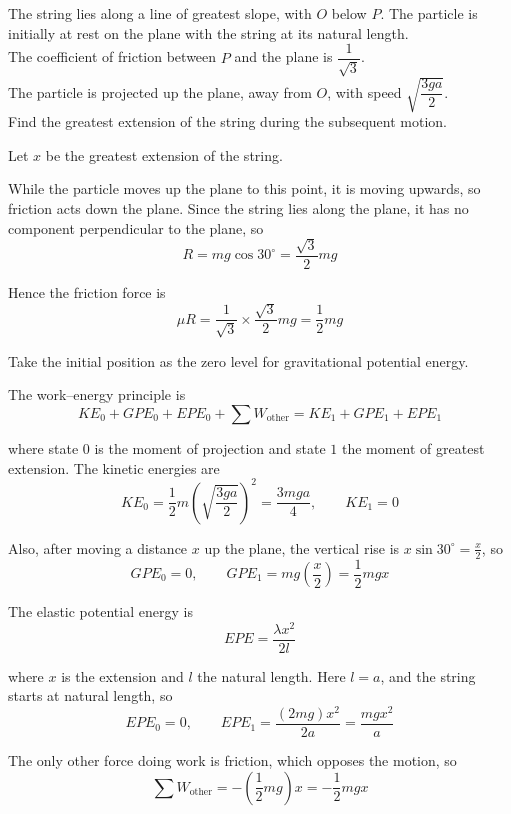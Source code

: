 \documentclass[leqno]{article}
\begin{document}
\begin{enumerate}[
  label=\textbf{\arabic*.},
  leftmargin=*,
  topsep=0pt,
  partopsep=0pt,
  parsep=0pt
]
The string lies along a line of greatest slope, with $O$ below $P$. The particle is initially at rest on the plane with the string at its natural length. \\

The coefficient of friction between $P$ and the plane is $\dfrac{1}{\sqrt{3}}$. \\

The particle is projected up the plane, away from $O$, with speed $\sqrt{\dfrac{3ga}{2}}$. \\

Find the greatest extension of the string during the subsequent motion.  \\

\vspace*{10pt}

\begin{djsSolution}
Let \(x\) be the greatest extension of the string.

While the particle moves up the plane to this point, it is moving upwards, so friction acts down the plane. Since the string lies along the plane, it has no component perpendicular to the plane, so
\[
R=mg\cos 30^\circ=\frac{\sqrt{3}}{2}mg
\]

Hence the friction force is
\[
\mu R=\frac{1}{\sqrt{3}}\times \frac{\sqrt{3}}{2}mg=\frac{1}{2}mg
\]

Take the initial position as the zero level for gravitational potential energy.

The work--energy principle is
\[
KE_0+GPE_0+EPE_0+\sum W_{\text{other}}=KE_1+GPE_1+EPE_1
\]

where state \(0\) is the moment of projection and state \(1\) the moment of greatest extension. The kinetic energies are
\[
KE_0=\frac12 m\left(\sqrt{\frac{3ga}{2}}\right)^2=\frac{3mga}{4},
\qquad
KE_1=0
\]

Also, after moving a distance \(x\) up the plane, the vertical rise is \(x\sin 30^\circ=\frac{x}{2}\), so
\[
GPE_0=0,
\qquad
GPE_1=mg\left(\frac{x}{2}\right)=\frac12 mgx
\]

The elastic potential energy is
\[
EPE=\frac{\lambda x^2}{2l}
\]

where \(x\) is the extension and \(l\) the natural length. Here \(l=a\), and the string starts at natural length, so
\[
EPE_0=0,
\qquad
EPE_1=\frac{(2mg)x^2}{2a}
=\frac{mgx^2}{a}
\]

The only other force doing work is friction, which opposes the motion, so
\[
\sum W_{\text{other}}=-\left(\frac12 mg\right)x=-\frac12 mgx
\]


\end{djsSolution}
\end{enumerate}
\end{document}
